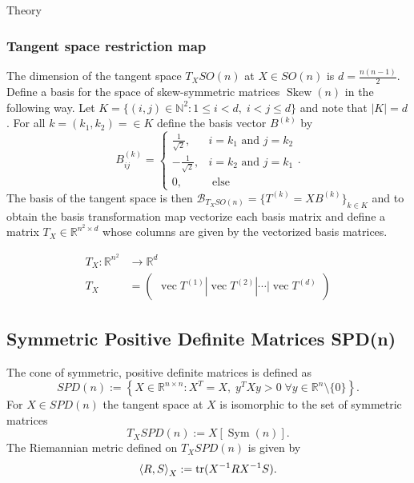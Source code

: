 \begin{chapter}{Theory}
\subsubsection{Tangent space restriction map} %
\label{ssub:TangentSO}
The dimension of the tangent space $T_XSO(n)$ at $X\in SO(n)$ is $d=\frac{n(n-1)}{2}$. Define a basis for the space of skew-symmetric matrices $\operatorname{Skew}(n)$ in the following
way. Let $K = \lbrace (i,j)\in\mathbb{N}^2: 1\leq i < d,\; i < j \leq d  \rbrace$ and note that $|K|=d$. For all $k=(k_1,k_2)=\in K$ define the basis vector $B^{(k)}$ by 
\begin{equation}
    B^{(k)}_{ij}=\begin{cases}
	\frac{1}{\sqrt{2}}, & i=k_1 \text{ and } j=k_2\\
	-\frac{1}{\sqrt{2}}, & i=k_2 \text{ and } j=k_1\\
	0, & \text{ else }
    \end{cases}.
\end{equation}
The basis of the tangent space is then $\mathcal{B}_{T_XSO(n)}=\lbrace T^{(k)} = XB^{(k)} \rbrace_{k\in K}$ and to obtain the basis transformation map vectorize each basis matrix and define a matrix $T_X\in\mathbb{R}^{n^2\times d}$ whose columns are given by the vectorized basis matrices.

\begin{align}
    T_X: \mathbb{R}^{n^2} &\to \mathbb{R}^{d}\\
    T_X&= \begin{pmatrix}
	\operatorname{vec}T^{(1)}|\operatorname{vec}T^{(2)}|\cdots|\operatorname{vec}T^{(d)}
    \end{pmatrix}
\end{align}


\subsection{Symmetric Positive Definite Matrices SPD(n)} %
\label{sub:SPD(N)}
The cone of symmetric, positive definite matrices is defined as
\begin{equation}
    SPD(n):=\left\lbrace X\in\mathbb{R}^{n\times n}:X^T=X,\; y^TXy>0\; \forall y\in\mathbb{R}^n\setminus\lbrace 0\rbrace  \right\rbrace.
\end{equation}
For $X\in SPD(n)$ the tangent space at $X$ is isomorphic to the set of symmetric matrices
\begin{equation}
    T_XSPD(n):=X[\operatorname{Sym}(n)].
\end{equation}
The Riemannian metric defined on $T_XSPD(n)$ is given by
\begin{equation}
    \label{eq:spdmetric}
    \left\langle R,S \right\rangle_X := \operatorname{tr}(X^{-1}RX^{-1}S).
\end{equation}


\end{chapter}
